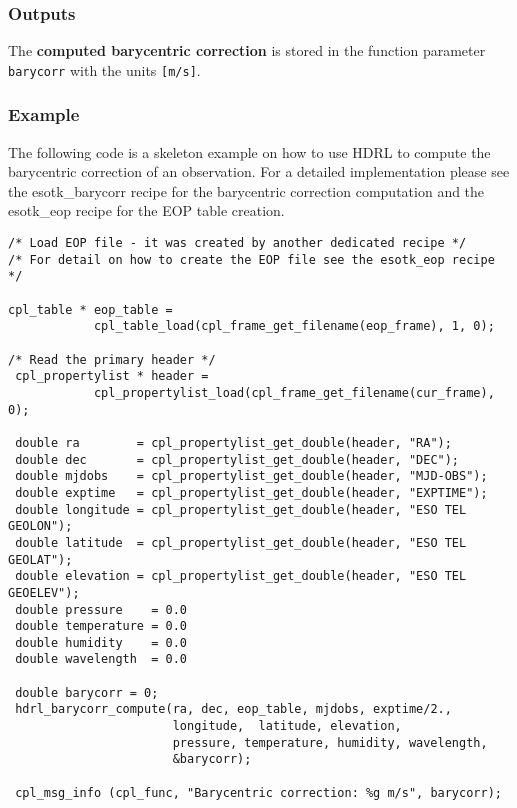 \subsubsection{Outputs}
\label{sec:algorithms:barycorr:outputs}

The \textbf{computed barycentric correction} is stored in the function
parameter \verb+barycorr+ with the units \verb+[m/s]+.

\subsubsection{Example}
The following code is a skeleton example on how to use HDRL to compute
the barycentric correction of an observation. For a detailed
implementation please see the esotk\_barycorr recipe for the
barycentric correction computation and the esotk\_eop recipe for
the EOP table creation.

\begin{lstlisting}
/* Load EOP file - it was created by another dedicated recipe */
/* For detail on how to create the EOP file see the esotk_eop recipe */

cpl_table * eop_table =
            cpl_table_load(cpl_frame_get_filename(eop_frame), 1, 0);

/* Read the primary header */
 cpl_propertylist * header =
            cpl_propertylist_load(cpl_frame_get_filename(cur_frame), 0);
 
 double ra        = cpl_propertylist_get_double(header, "RA");
 double dec       = cpl_propertylist_get_double(header, "DEC");
 double mjdobs    = cpl_propertylist_get_double(header, "MJD-OBS");
 double exptime   = cpl_propertylist_get_double(header, "EXPTIME");
 double longitude = cpl_propertylist_get_double(header, "ESO TEL GEOLON");
 double latitude  = cpl_propertylist_get_double(header, "ESO TEL GEOLAT");
 double elevation = cpl_propertylist_get_double(header, "ESO TEL GEOELEV");
 double pressure    = 0.0
 double temperature = 0.0
 double humidity    = 0.0
 double wavelength  = 0.0

 double barycorr = 0;
 hdrl_barycorr_compute(ra, dec, eop_table, mjdobs, exptime/2.,
                       longitude,  latitude, elevation,
                       pressure, temperature, humidity, wavelength,
                       &barycorr);
                                 
 cpl_msg_info (cpl_func, "Barycentric correction: %g m/s", barycorr);
\end{lstlisting}
